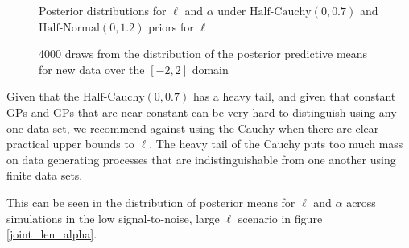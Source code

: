 \documentclass{article}
\begin{document}
\begin{figure}[h]
  \centering
  \caption{Posterior distributions for $\ell$ and $\alpha$ under
  $\text{Half-Cauchy}(0, 0.7)$ and $\text{Half-Normal}(0, 1.2)$ priors for $\ell$} \label{gp_set_3_len}
\end{figure}

\begin{figure}[t]
  \centering
  \caption{4000 draws from the distribution of the posterior predictive means for new data over the $[-2,2]$ domain} \label{gp_set_3_post_pred_cauchy}
\end{figure}

Given that the $\text{Half-Cauchy}(0, 0.7)$ has a heavy tail, and given that
constant GPs and GPs that are near-constant can be very hard to distinguish
using any one data set, we recommend against using the Cauchy when there are
clear practical upper bounds to $\ell$. The heavy tail of the Cauchy puts too
much mass on data generating processes that are indistinguishable from one
another using finite data sets.

This can be seen in the distribution of posterior means for $\ell$ and $\alpha$
across simulations in the low signal-to-noise, large $\ell$ scenario in figure \ref{joint_len_alpha}. 
\end{document}

